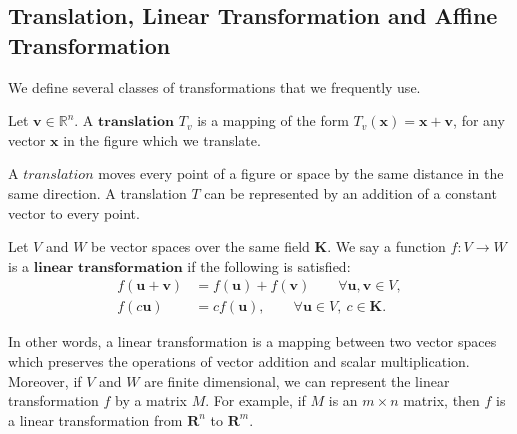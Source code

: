    \subsection{Translation, Linear Transformation and Affine Transformation}
      
      We define several classes of transformations that we frequently use.
      
      \begin{definition*}
         Let $\textbf{v}\in\mathbb{R}^n$. A $\textbf{translation}$ ${T}_v$ is a mapping of the form ${T}_v (\textbf{x}) = \textbf{x} + \textbf{v}$, for any vector $\textbf{x}$ in the figure which we translate.
      \end{definition*}
      A $\textit{translation}$ moves every point of a figure or space by the same distance in the same direction. A translation ${T}$ can be represented by an addition of a constant vector to every point.


      \begin{definition*}
      Let ${V}$ and ${W}$ be vector spaces over the same field $\textbf{K}$. We say a function $\mathit{f}: {V} \rightarrow {W}$ is a $\textbf{linear transformation}$ if the following is satisfied:
      \begin{align*}
      \mathit{f}(\textbf{u} + \textbf{v}) &= \mathit{f}(\textbf{u}) + \mathit{f}(\textbf{v}) \qquad \forall \textbf{u}, \textbf{v} \in{V},\\
      \mathit{f}(c\textbf{u}) &= c\mathit{f}(\textbf{u}), \qquad \forall \textbf{u} \in{V}, ~c\in\textbf{K}.
      \end{align*}
      \end{definition*}
      In other words, a linear transformation is a mapping between two vector spaces which preserves the operations of vector addition and scalar multiplication. Moreover, if ${V}$ and ${W}$ are finite dimensional, we can represent the linear transformation ${f}$ by a matrix ${M}$. For example, if ${M}$ is an ${m} \times {n}$ matrix, then ${f}$ is a linear transformation from $\mathbf{R}^n$ to $\mathbf{R}^m$. 


